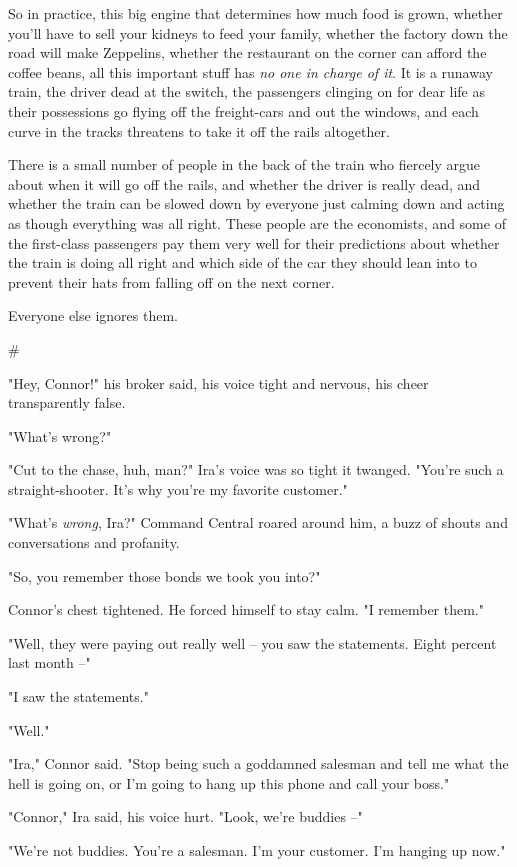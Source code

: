 So in practice, this big engine that determines how much food is
grown, whether you'll have to sell your kidneys to feed your
family, whether the factory down the road will make Zeppelins,
whether the restaurant on the corner can afford the coffee beans,
all this important stuff has \emph{no one in charge of it}. It is a
runaway train, the driver dead at the switch, the passengers
clinging on for dear life as their possessions go flying off the
freight-cars and out the windows, and each curve in the tracks
threatens to take it off the rails altogether.

There is a small number of people in the back of the train who
fiercely argue about when it will go off the rails, and whether the
driver is really dead, and whether the train can be slowed down by
everyone just calming down and acting as though everything was all
right. These people are the economists, and some of the first-class
passengers pay them very well for their predictions about whether
the train is doing all right and which side of the car they should
lean into to prevent their hats from falling off on the next
corner.

Everyone else ignores them.

\#

"Hey, Connor!" his broker said, his voice tight and nervous, his
cheer transparently false.

"What's wrong?"

"Cut to the chase, huh, man?" Ira's voice was so tight it twanged.
"You're such a straight-shooter. It's why you're my favorite
customer."

"What's \emph{wrong}, Ira?" Command Central roared around him, a
buzz of shouts and conversations and profanity.

"So, you remember those bonds we took you into?"

Connor's chest tightened. He forced himself to stay calm. "I
remember them."

"Well, they were paying out really well -- you saw the statements.
Eight percent last month --"

"I saw the statements."

"Well."

"Ira," Connor said. "Stop being such a goddamned salesman and tell
me what the hell is going on, or I'm going to hang up this phone
and call your boss."

"Connor," Ira said, his voice hurt. "Look, we're buddies --"

"We're not buddies. You're a salesman. I'm your customer. I'm
hanging up now."

